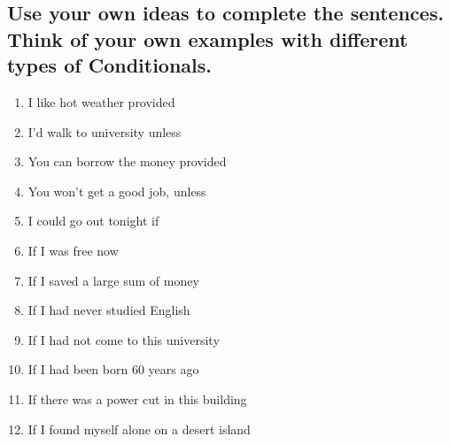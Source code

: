 \subsection*{Use your own ideas to complete the sentences. Think of your own examples with different types of Conditionals.}
\begin{enumerate}
      \item I like hot weather provided \underline{\hspace{2cm}}
      \item I’d walk to university unless \underline{\hspace{2cm}}
      \item You can borrow the money provided \underline{\hspace{2cm}}
      \item You won’t get a good job, unless \underline{\hspace{2cm}}
      \item I could go out tonight if \underline{\hspace{2cm}}
      \item If I was free now \underline{\hspace{2cm}}
      \item If I saved a large sum of money \underline{\hspace{2cm}}
      \item If I had never studied English \underline{\hspace{2cm}}
      \item If I had not come to this university \underline{\hspace{2cm}}
      \item If I had been born 60 years ago \underline{\hspace{2cm}}
      \item If there was a power cut in this building \underline{\hspace{2cm}}
      \item If I found myself alone on a desert island \underline{\hspace{2cm}}
\end{enumerate}

